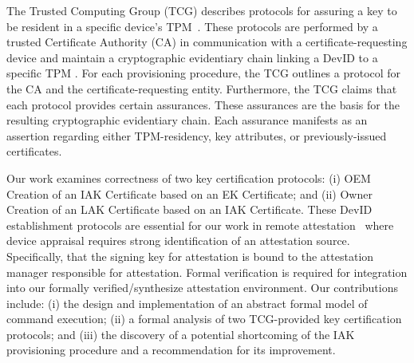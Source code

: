 \documentclass[runningheads]{llncs}
\begin{document}
The Trusted Computing Group (TCG) describes protocols for assuring a
key to be resident in a specific device's
TPM~\citep{DevIDSpec-TCG}. These protocols are performed by a trusted
Certificate Authority (CA) in communication with a
certificate-requesting device and maintain a cryptographic evidentiary
chain linking a DevID to a specific TPM \citep{DevIDSpec-TCG}.  For
each provisioning procedure, the TCG outlines a protocol for the CA
and the certificate-requesting entity. Furthermore, the TCG claims
that each protocol provides certain assurances. These assurances are
the basis for the resulting cryptographic evidentiary chain.  Each
assurance manifests as an assertion regarding either TPM-residency,
key attributes, or previously-issued certificates.

Our work examines correctness of two key certification protocols: (i)
OEM Creation of an IAK Certificate based on an EK Certificate; and
(ii) Owner Creation of an LAK Certificate based on an IAK
Certificate. These DevID establishment protocols are essential for our
work in remote
attestation~\citep{Coker::Principles-of-R,petz2022innovations} where
device appraisal requires strong identification of an attestation
source. Specifically, that the signing key for attestation is bound to
the attestation manager responsible for attestation.  Formal
verification is required for integration into our formally
verified/synthesize attestation
environment\citep{petz2022innovations}.  Our contributions include:
(i) the design and implementation of an abstract formal model of
command execution; (ii) a formal analysis of two TCG-provided key
certification protocols; and (iii) the discovery of a potential
shortcoming of the IAK provisioning procedure and a recommendation for
its improvement.
\end{document}
